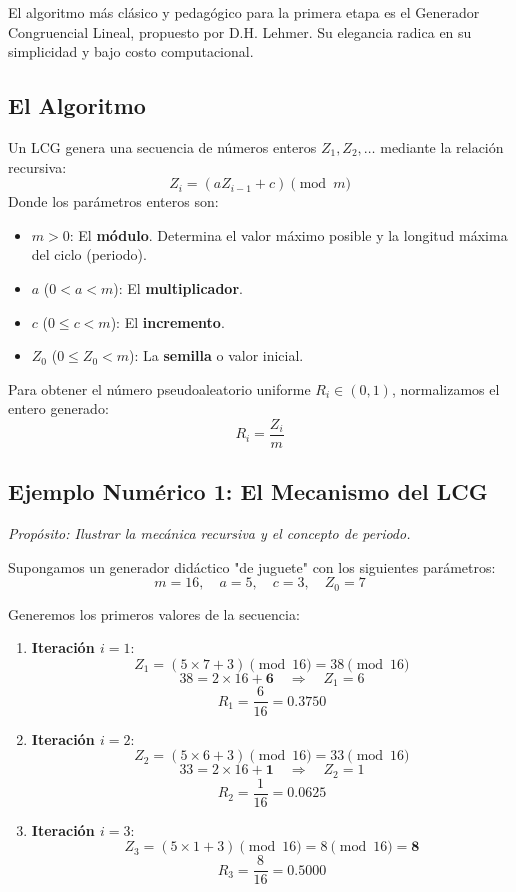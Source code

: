 \documentclass[11pt, letterpaper]{article}
\begin{document}
El algoritmo más clásico y pedagógico para la primera etapa es el Generador Congruencial Lineal, propuesto por D.H. Lehmer. Su elegancia radica en su simplicidad y bajo costo computacional.

\subsection{El Algoritmo}
Un LCG genera una secuencia de números enteros $Z_1, Z_2, \dots$ mediante la relación recursiva:
\begin{equation}
    Z_{i} = (a Z_{i-1} + c) \pmod m
\end{equation}
Donde los parámetros enteros son:
\begin{itemize}
    \item $m > 0$: El \textbf{módulo}. Determina el valor máximo posible y la longitud máxima del ciclo (periodo).
    \item $a$ ($0 < a < m$): El \textbf{multiplicador}.
    \item $c$ ($0 \leq c < m$): El \textbf{incremento}.
    \item $Z_0$ ($0 \leq Z_0 < m$): La \textbf{semilla} o valor inicial.
\end{itemize}

Para obtener el número pseudoaleatorio uniforme $R_i \in (0,1)$, normalizamos el entero generado:
\begin{equation}
    R_i = \frac{Z_i}{m}
\end{equation}

\subsection{Ejemplo Numérico 1: El Mecanismo del LCG}
\textit{Propósito: Ilustrar la mecánica recursiva y el concepto de periodo.}

Supongamos un generador didáctico "de juguete" con los siguientes parámetros:
$$ m=16, \quad a=5, \quad c=3, \quad Z_0=7 $$

Generemos los primeros valores de la secuencia:

\begin{enumerate}
    \item \textbf{Iteración $i=1$}:
    $$ Z_1 = (5 \times 7 + 3) \pmod{16} = 38 \pmod{16} $$
    $$ 38 = 2 \times 16 + \mathbf{6} \quad \Rightarrow \quad Z_1 = 6 $$
    $$ R_1 = \frac{6}{16} = \mathbf{0.3750} $$
    
    \item \textbf{Iteración $i=2$}:
    $$ Z_2 = (5 \times 6 + 3) \pmod{16} = 33 \pmod{16} $$
    $$ 33 = 2 \times 16 + \mathbf{1} \quad \Rightarrow \quad Z_2 = 1 $$
    $$ R_2 = \frac{1}{16} = \mathbf{0.0625} $$
    
    \item \textbf{Iteración $i=3$}:
    $$ Z_3 = (5 \times 1 + 3) \pmod{16} = 8 \pmod{16} = \mathbf{8} $$
    $$ R_3 = \frac{8}{16} = \mathbf{0.5000} $$
\end{enumerate}
\end{document}
